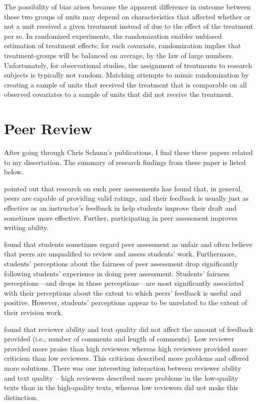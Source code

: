 \documentclass{article}
\begin{document}
The possibility of bias arises because the apparent difference in outcome between these two groups of units may depend on characteristics that affected whether or not a unit received a given treatment instead of due to the effect of the treatment per se. In randomized experiments, the randomization enables unbiased estimation of treatment effects; for each covariate, randomization implies that treatment-groups will be balanced on average, by the law of large numbers. Unfortunately, for observational studies, the assignment of treatments to research subjects is typically not random. Matching attempts to mimic randomization by creating a sample of units that received the treatment that is comparable on all observed covariates to a sample of units that did not receive the treatment.

\section{Peer Review}
After going through Chris Schunn's publications, I find these three papers
\cite{patchan2016understanding,kaufman2011students,patchan2015understanding}
related to my dissertation. The summary of research findings from
these paper is listed below.

\cite{patchan2016understanding} pointed out that research on such peer assessments has found that, in general, peers
are capable of providing valid ratings, and their feedback is usually
just as effective as an instructor's feedback in help students improve
their draft and sometimes more effective. Further, participating in
peer assessment improves writing ability.

\cite{kaufman2011students} found that students
sometimes regard peer assessment as unfair and often believe that peers are
unqualified to review and assess students’ work. Furthermore, students’ perceptions about
the fairness of peer assessment drop significantly following students’ experience in doing
peer assessment. Students’ fairness perceptions—and drops in those perceptions—are most
significantly associated with their perceptions about the extent to which peers’ feedback is
useful and positive. However, students’ perceptions appear to be unrelated to the extent of
their revision work.

\cite{patchan2015understanding} found that reviewer ability and text quality did not affect the amount of
feedback provided (i.e., number of comments and length of
comments). Low reviewer provided more praise than high reviewers
whereas high reviewers provided more criticism than low
reviewers. This criticism described more problems and offered more
solutions. There was one interesting interaction between reviewer
ability and text quality -- high reviewers described more problems in
the low-quality texts than in the high-quality texts, whereas low
reviewers did not make this distinction.
\end{document}
